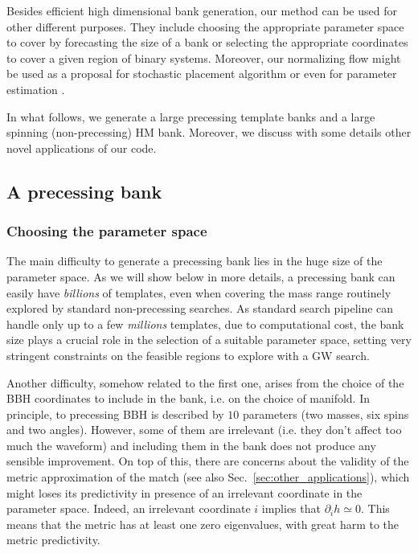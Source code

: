 \documentclass[twocolumn,showpacs,preprintnumbers,nofootinbib,prd,
superscriptaddress,10pt]{revtex4-2}
\begin{document}
Besides efficient high dimensional bank generation, our method can be used for other different purposes. They include choosing the appropriate parameter space to cover by forecasting the size of a bank or selecting the appropriate coordinates to cover a given region of binary systems. Moreover, our normalizing flow might be used as a proposal for stochastic placement algorithm or even for parameter estimation \cite{Veitch:2014wba}.

In what follows, we generate a large precessing template banks and a large spinning (non-precessing) HM bank. Moreover, we discuss with some details other novel applications of our code.

\subsection{A precessing bank} \label{sec:precessing_bank}

\subsubsection{Choosing the parameter space}

The main difficulty to generate a precessing bank lies in the huge size of the parameter space. As we will show below in more details, a precessing bank can easily have {\it billions} of templates, even when covering the mass range routinely explored by standard non-precessing searches. As standard search pipeline can handle only up to a few {\it millions} templates, due to computational cost, the bank size plays a crucial role in the selection of a suitable parameter space, setting very stringent constraints on the feasible regions to explore with a GW search.

Another difficulty, somehow related to the first one, arises from the choice of the BBH coordinates to include in the bank, i.e. on the choice of manifold.
In principle, to precessing BBH is described by $10$ parameters (two masses, six spins and two angles). However, some of them are irrelevant (i.e. they don't affect too much the waveform) and including them in the bank does not produce any sensible improvement.
On top of this, there are concerns about the validity of the metric approximation of the match (see also Sec.~\ref{sec:other_applications}), which might loses its predictivity in presence of an irrelevant coordinate in the parameter space. Indeed, an irrelevant coordinate $i$ implies that $\partial_i h \simeq 0$. This means that the metric has at least one zero eigenvalues, with great harm to the metric predictivity.
\end{document}

